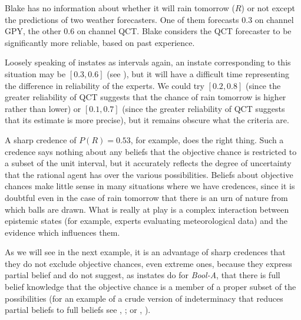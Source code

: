 \documentclass[11pt]{article}
\newcommand{\anderson}[0]{\textit{Bool-A}}
\begin{document}
\begin{quotex}
  \label{ex:aggreg} Blake has no
  information about whether it will rain tomorrow ($R$) or not except
  the predictions of two weather forecasters. One of them forecasts
  0.3 on channel GPY, the other 0.6 on channel QCT. Blake considers
  the QCT forecaster to be significantly more reliable, based on past
  experience.
\end{quotex}

Loosely speaking of instates as intervals again, an instate
corresponding to this situation may be $[0.3,0.6]$ (see
), but it will have a difficult time
representing the difference in reliability of the experts. We could
try $[0.2,0.8]$ (since the greater reliability of QCT suggests that
the chance of rain tomorrow is higher rather than lower) or
$[0.1,0.7]$ (since the greater reliability of QCT suggests that its
estimate is more precise), but it remains obscure what the criteria
are.

A sharp credence of $P(R)=0.53$, for example, does the right thing.
Such a credence says nothing about any beliefs that the objective
chance is restricted to a subset of the unit interval, but it
accurately reflects the degree of uncertainty that the rational agent
has over the various possibilities. Beliefs about objective chances
make little sense in many situations where we have credences, since it
is doubtful even in the case of rain tomorrow that there is an urn of
nature from which balls are drawn. What is really at play is a complex
interaction between epistemic states (for example, experts evaluating
meteorological data) and the evidence which influences them.

As we will see in the next example, it is an advantage of sharp
credences that they do not exclude objective chances, even extreme
ones, because they express partial belief and do not suggest, as
instates do for {\anderson}, that there is full belief knowledge
that the objective chance is a member of a proper subset of the
possibilities (for an example of a crude version of indeterminacy that
reduces partial beliefs to full beliefs see ,
; or ,
).
\end{document}
